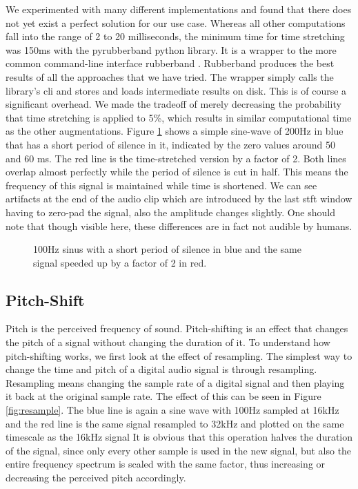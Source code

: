 We experimented with many different implementations and found that there does not yet exist a perfect solution for our use case. Whereas all other computations fall into the range of 2 to 20 milliseconds, the minimum time for time stretching was 150ms with the pyrubberband \cite{pyrubberband} python library. It is a wrapper to the more common command-line interface rubberband \cite{rubberband}. Rubberband produces the best results of all the approaches that we have tried. The wrapper simply calls the library's \gls{cli} and stores and loads intermediate results on disk. This is of course a significant overhead. We made the tradeoff of merely decreasing the probability that time stretching is applied to 5\%, which results in similar computational time as the other augmentations. Figure \ref{fig:timestretch} shows a simple sine-wave of 200Hz in blue that has a short period of silence in it, indicated by the zero values around 50 and 60 ms. The red line is the time-stretched version by a factor of 2. Both lines overlap almost perfectly while the period of silence is cut in half. This means the frequency of this signal is maintained while time is shortened. We can see artifacts at the end of the audio clip which are introduced by the last \gls{stft} window having to zero-pad the signal, also the amplitude changes slightly. One should note that though visible here, these differences are in fact not audible by humans.

\begin{figure}[H]
    \centering
    
    \caption[Time-stretch]{100Hz sinus with a short period of silence in blue and the same signal speeded up by a factor of 2 in red.}
    \label{fig:timestretch}
\end{figure}

\subsection{Pitch-Shift}

Pitch is the perceived frequency of sound. Pitch-shifting is an effect that changes the pitch of a signal without changing the duration of it. To understand how pitch-shifting works, we first look at the effect of resampling. The simplest way to change the time and pitch of a digital audio signal is through resampling. Resampling means changing the sample rate of a digital signal and then playing it back at the original sample rate. The effect of this can be seen in Figure \ref{fig:resample}. The blue line is again a sine wave with 100Hz sampled at 16kHz and the red line is the same signal resampled to 32kHz and plotted on the same timescale as the 16kHz signal It is obvious that this operation halves the duration of the signal, since only every other sample is used in the new signal, but also the entire frequency spectrum is scaled with the same factor, thus increasing or decreasing the perceived pitch accordingly.

